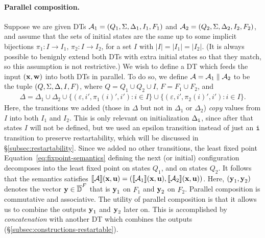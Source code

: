 \paragraph*{Parallel composition.}
Suppose we are given DTs $\mathcal{A}_1 = (Q_{1}, \Sigma, \Delta_{1}, I_{1}, F_{1})$ and $\mathcal{A}_2 = (Q_{2}, \Sigma, \Delta_{2}, I_{2}, F_{2})$, and assume that the sets of initial states are the same up to some implicit bijections $\pi_1: I \to I_1$, $\pi_2: I \to I_2$, for a set $I$ with $|I| = |I_1| = |I_2|$. (It is always possible to benignly extend both DTs with extra initial states so that they match, so this assumption is not restrictive.)
We wish to define a DT which feeds the input $(\textbf{x},\textbf{w})$ into both DTs in parallel. To do so, we define $\mathcal{A} = \mathcal{A}_1 \; \| \; \mathcal{A}_2$ to be the tuple $(Q, \Sigma, \Delta, I, F){}$, where $Q = Q_1 \cup Q_2 \cup I$, $F = F_1 \cup F_2$, and 
\begin{align*}
\Delta = \Delta_1 \cup \Delta_2
    \cup \big\{(\varepsilon, i', \pi_1(i)', i') : i \in I \big\}
    \cup \big\{(\varepsilon, i', \pi_2(i)', i') : i \in I \big\}.
\end{align*}
Here, the transitions we added (those in $\Delta$ but not in $\Delta_1$ or $\Delta_2$) \emph{copy} values from $I$ into both $I_1$ and $I_2$. This is only relevant on initialization $\Delta_{\texttt{i}}$, since after that states $I$ will not be defined, but we used an epsilon transition instead of just an ${\texttt{i}}$ transition to preserve restartability, which will be discussed in \S\ref{subsec:restartability}. Since we added no other transitions, the least fixed point Equation~\eqref{eq:fixpoint-semantics} defining the next (or initial) configuration decomposes into the least fixed point on states $Q_1$, and on states $Q_2$. It follows that the semantics satisfies $\llbracket \mathcal{A} \rrbracket(\textbf{x},\textbf{u}) = (\llbracket \mathcal{A}_1 \rrbracket(\textbf{x},\textbf{u}),\llbracket \mathcal{A}_2 \rrbracket(\textbf{x},\textbf{u}))$. Here, $(\textbf{y}_1,\textbf{y}_2)$ denotes the vector $\textbf{y} \in \overline{\mathbb{D}{}}^F$ that is $\textbf{y}_1$ on $F_1$ and $\textbf{y}_2$ on $F_2$.
Parallel composition is commutative and associative.
The utility of parallel composition is that it allows us to combine the outputs $\textbf{y}_1$ and $\textbf{y}_2$ later on. This is accomplished by \emph{concatenation} with another DT which combines the outputs (\S\ref{subsec:constructions-restartable}).

\begin{figure*}[h]

\label{fig:parallel-composition}
\end{figure*}

